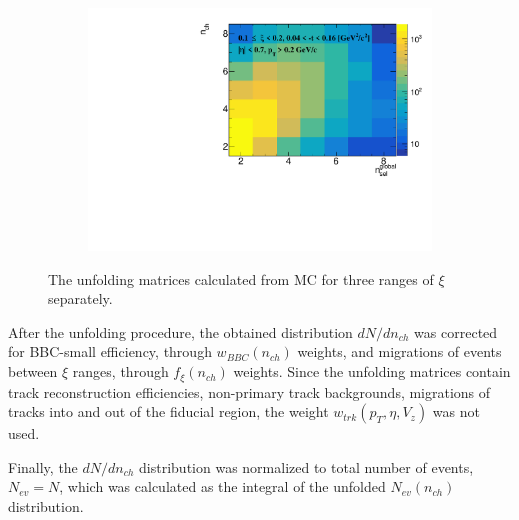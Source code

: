 \begin{figure}[h!]
\begin{subfigure}{.49\textwidth}
		\includegraphics[width=\textwidth,page=1]{chapters/chrgSTAR/img/unfolding/matrix_2.pdf}
	\end{subfigure}
	\begin{minipage}{.49\textwidth}
		\caption{The unfolding matrices calculated  from MC for three ranges of $\xi$ separately.}
		\label{fig:responseSTAR}
	\end{minipage}
\end{figure}
\captionsetup{format=default,indention=0pt,justification=justified}

After the unfolding procedure, the  obtained distribution $dN/dn_{ch}$
was corrected for BBC-small efficiency, through $w_{BBC}(n_{ch})$ weights, and migrations of events between $\xi$ ranges, through $f_{\xi}(n_{ch})$ weights. Since the unfolding matrices contain track reconstruction efficiencies, non-primary track backgrounds, migrations of tracks into and out of the fiducial region, the weight $w_{trk}\left(p_T,\eta,V_{z}\right)$ was not used.

Finally, the $dN/dn_{ch}$ distribution was normalized to total number of events, $N_{ev}=N$, which was calculated as the integral of the unfolded $N_{ev}(n_{ch})$ distribution.



\FloatBarrier